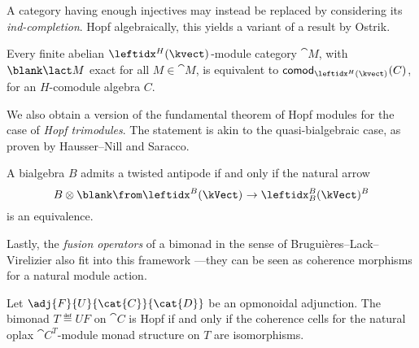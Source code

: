 \documentclass[portrait, noFonts]{betterposter/betterposter}
\begin{document}
{  A category having enough injectives may instead be replaced by considering its \emph{ind-completion}.
  Hopf algebraically,
  this yields a variant of a result by Ostrik.

  \vspace{0.5em}\begin{highlight}
    Every finite abelian \(\tetramodfd[H]{}\)-module category \(\cat{M}\),
    with \(\blank \lact M\) exact for all \(M \in \cat{M}\),
    is equivalent to \(\mathsf{comod}_{\tetramodfd[H]{}}(C)\), for an \(H\)-comodule algebra \(C\).
  \end{highlight}
}{                                                             %
  We also obtain a version of the fundamental theorem of Hopf modules
  for the case of \emph{Hopf trimodules}.
  The statement is akin to the quasi-bialgebraic case, as proven by Hausser--Nill and Saracco.

  \vspace{0.8em}\begin{highlight}
    A bialgebra \(B\) admits a twisted antipode
    if and only if
    the natural arrow
    \[
      B \otimes \blank \from \tetramod[B] \to \tetramod[B][B][][B]
    \]
    is an equivalence.
  \end{highlight}

  Lastly, the \emph{fusion operators} of a bimonad
  in the sense of Bruguières--Lack--Virelizier
  also fit into this framework%
  ---they can be seen as coherence morphisms for a natural module action.

  \vspace{0.8em}\begin{highlight}
    Let \(\adj{F}{U}{\cat{C}}{\cat{D}}\) be an opmonoidal adjunction.
    The bimonad \(T \eqdef UF\) on \(\cat{C}\) is Hopf
    if and only if
    the coherence cells for the natural oplax \(\cat{C}^T\)-module monad structure on \(T\) are isomorphisms.
  \end{highlight}
}
\end{document}
